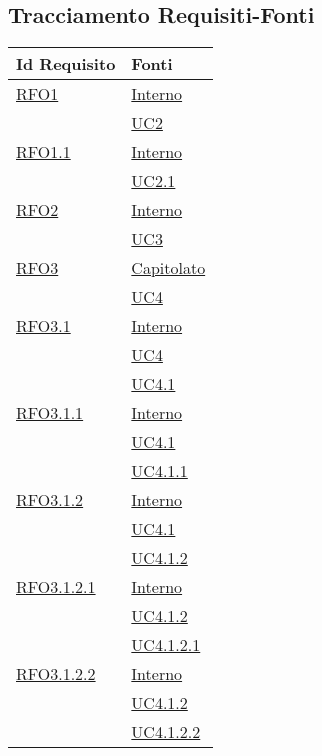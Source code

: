 \subsection{Tracciamento Requisiti-Fonti}
\normalsize
\begin{longtable}{|>{\centering}m{5cm}|m{5cm}<{\centering}|}
\hline
\textbf{Id Requisito} & \textbf{Fonti}\\
\hline
\endhead
\hyperlink{RFO1}{RFO1} & \hyperlink{Interno}{Interno}\\  &\hyperref[UC2]{UC2}\\ \hline

\hyperlink{RFO1.1}{RFO1.1} &  \hyperlink{Interno}{Interno}\\  &\hyperref[UC2.1]{UC2.1}\\ \hline

\hyperlink{RFO2}{RFO2}  &  \hyperlink{Interno}{Interno}\\  &\hyperref[UC3]{UC3}\\ \hline

\hyperlink{RFO3}{RFO3} &  \hyperlink{Capitolato}{Capitolato}\\  &\hyperref[UC4]{UC4}\\ \hline

\hyperlink{RFO3.1}{RFO3.1} &  \hyperlink{Interno}{Interno}\\ &\hyperref[UC4]{UC4}\\ &\hyperref[UC4.1]{UC4.1}\\ \hline

\hyperlink{RFO3.1.1}{RFO3.1.1} &  \hyperlink{Interno}{Interno}\\ &\hyperref[UC4.1]{UC4.1}\\ &\hyperref[UC4.1.1]{UC4.1.1}\\ \hline

\hyperlink{RFO3.1.2}{RFO3.1.2} &  \hyperlink{Interno}{Interno}\\ &\hyperref[UC4.1]{UC4.1}\\ &\hyperref[UC4.1.2]{UC4.1.2}\\ \hline

\hyperlink{RFO3.1.2.1}{RFO3.1.2.1} &  \hyperlink{Interno}{Interno}\\ &\hyperref[UC4.1.2]{UC4.1.2}\\ &\hyperref[UC4.1.2.1]{UC4.1.2.1}\\ \hline

\hyperlink{RFO3.1.2.2}{RFO3.1.2.2} &  \hyperlink{Interno}{Interno}\\ &\hyperref[UC4.1.2]{UC4.1.2}\\ &\hyperref[UC4.1.2.2]{UC4.1.2.2}\\ \hline


\end{longtable}
